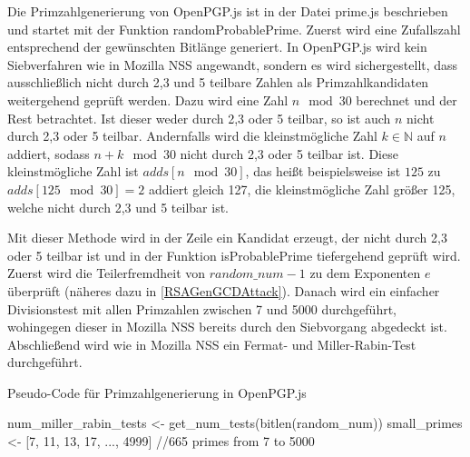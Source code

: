 Die Primzahlgenerierung von OpenPGP.js ist in der Datei prime.js beschrieben und startet mit der Funktion randomProbablePrime.
Zuerst wird eine Zufallszahl entsprechend der gewünschten Bitlänge generiert.
In OpenPGP.js wird kein Siebverfahren wie in Mozilla NSS angewandt, sondern es wird sichergestellt, dass ausschließlich nicht durch 2,3 und 5 teilbare Zahlen als Primzahlkandidaten weitergehend geprüft werden.
Dazu wird eine Zahl $n \mod 30$ berechnet und der Rest betrachtet.
Ist dieser weder durch 2,3 oder 5 teilbar, so ist auch $n$ nicht durch 2,3 oder 5 teilbar.
Andernfalls wird die kleinstmögliche Zahl $k \in \mathbb{N}$ auf $n$ addiert, sodass $n + k \mod 30$ nicht durch 2,3 oder 5 teilbar ist.
Diese kleinstmögliche Zahl ist $adds[n \mod 30]$, das heißt beispielsweise ist $125$ zu $adds[125 \mod 30] = 2$ addiert gleich 127, die kleinstmögliche Zahl größer 125, welche nicht durch 2,3 und 5 teilbar ist.

Mit dieser Methode wird in der Zeile ein Kandidat erzeugt, der nicht durch 2,3 oder 5 teilbar ist und in der Funktion isProbablePrime tiefergehend geprüft wird.
Zuerst wird die Teilerfremdheit von $random\_num -1$ zu dem Exponenten $e$ überprüft (näheres dazu in \ref{RSAGenGCDAttack}).
Danach wird ein einfacher Divisionstest mit allen Primzahlen zwischen 7 und 5000 durchgeführt, wohingegen dieser in Mozilla NSS bereits durch den Siebvorgang abgedeckt ist.
Abschließend wird wie in Mozilla NSS ein Fermat- und Miller-Rabin-Test durchgeführt.

\begin{algorithm}[h]
\DontPrintSemicolon
\caption{Pseudo-Code für Primzahlgenerierung in OpenPGP.js}
\label{alg:randomProbablePrimeOpenPGPjs}
num_miller_rabin_tests <- get_num_tests(bitlen(random\_num))\;
small\_primes <- [7, 11, 13, 17, ..., 4999] //665 primes from 7 to 5000\;


\end{algorithm}

